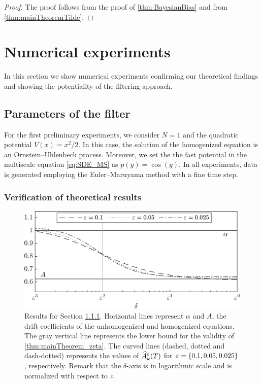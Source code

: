 \documentclass[review,onefignum,onetabnum]{siamonline190516}
\begin{document}
\begin{proof} The proof follows from the proof of \cref{thm:BayesianBias} and from \cref{thm:mainTheoremTilde}.
\end{proof}


\section{Numerical experiments}\label{sec:NumExp}

In this section we show numerical experiments confirming our theoretical findings and showing the potentiality of the filtering approach.

\subsection{Parameters of the filter}\label{sec:Num_Param}

For the first preliminary experiments, we consider $N = 1$ and the quadratic potential $V(x) = x^2/2$. In this case, the solution of the homogenized equation is an Ornstein--Uhlenbeck process. Moreover, we set the the fast potential in the multiscale equation \eqref{eq:SDE_MS} as $p(y) = \cos(y)$. In all experiments, data is generated employing the Euler--Maruyama method with a fine time step.

\subsubsection{Verification of theoretical results}\label{sec:Num_Param1}

\begin{figure}[t]
	\centering
	\includegraphics[]{Figures/Transition}
	\caption{Results for Section \ref{sec:Num_Param1}. Horizontal lines represent $\alpha$ and $A$, the drift coefficients of the unhomogenized and homogenized equations. The gray vertical line represents the lower bound for the validity of \cref{thm:mainTheorem_zeta}. The curved lines (dashed, dotted and dash-dotted) represents the values of $\widehat A_k^\varepsilon(T)$ for $\varepsilon = \{0.1, 0.05, 0.025\}$, respectively. Remark that the $\delta$-axis is in logarithmic scale and is normalized with respect to $\varepsilon$.}
	\label{fig:TheoremVerification}
\end{figure}
\end{document}
